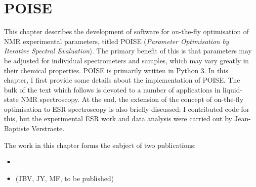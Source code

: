 \chapter{POISE}
\label{chpt:poise}

This chapter describes the development of software for on-the-fly optimisation of NMR experimental parameters, titled POISE (\textit{Parameter Optimisation by Iterative Spectral Evaluation}).
The primary benefit of this is that parameters may be adjusted for individual spectrometers and samples, which may vary greatly in their chemical properties.
POISE is primarily written in Python 3.
In this chapter, I first provide some details about the implementation of POISE.
The bulk of the text which follows is devoted to a number of applications in liquid-state NMR spectroscopy.
At the end, the extension of the concept of on-the-fly optimisation to ESR spectroscopy is also briefly discussed: I contributed code for this, but the experimental ESR work and data analysis were carried out by Jean-Baptiste Verstraete.

The work in this chapter forms the subject of two publications:

\begin{itemize}
    \item {}
    \item (JBV, JY, MF, to be published)
\end{itemize}







\printbibliography[heading=subbibnumbered]{}
